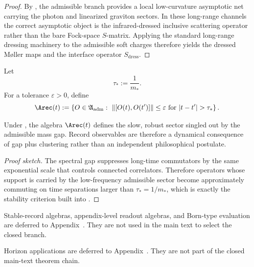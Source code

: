 \begin{proof}
By , the admissible branch
provides a local low-curvature asymptotic net carrying the photon and linearized graviton sectors.
In these long-range channels the correct asymptotic object is the infrared-dressed inclusive
scattering operator rather than the bare Fock-space $S$-matrix. Applying the standard long-range
dressing machinery to the admissible soft charges therefore yields the dressed M\o ller maps and
the interface operator $S_{\mathrm{dress}}$.
\end{proof}

\begin{definition}
\label{def:stable-record-algebra}
Let
\[
\tau_*:=\frac{1}{m_*}.
\]
For a tolerance $\varepsilon>0$, define
\[
\Arec(t)
:=
\left\{
O\in\mathfrak A_{\mathrm{adm}}
:\ \|[O(t),O(t')]\|\le\varepsilon
\text{ for } |t-t'|>\tau_*
\right\}.
\]
\end{definition}

\begin{proposition}
Under , the algebra $\Arec(t)$ defines the slow, robust sector singled out by the admissible mass gap. Record observables are therefore a dynamical consequence of gap plus clustering rather than an independent philosophical postulate.
\end{proposition}

\begin{proof}[Proof sketch]
The spectral gap suppresses long-time commutators by the same exponential scale that controls connected correlators. Therefore operators whose support is carried by the low-frequency admissible sector become approximately commuting on time separations larger than $\tau_*=1/m_*$, which is exactly the stability criterion built into .
\end{proof}

\begin{remark}
Stable-record algebras, appendix-level readout algebras, and Born-type evaluation are deferred to
Appendix~. They are not used in the main text to select the closed branch.
\end{remark}

\begin{remark}
Horizon applications are deferred to Appendix~. They are not part of the closed
main-text theorem chain.
\end{remark}

